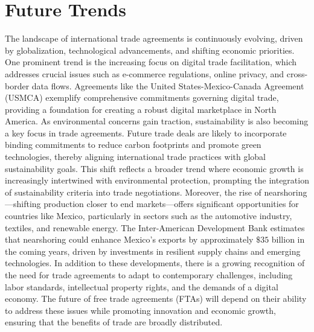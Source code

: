 \documentclass[12pt]{article}
\begin{document}
\section{Future Trends}
The landscape of international trade agreements is continuously evolving, driven by globalization, technological advancements, and shifting economic priorities. One prominent trend is the increasing focus on digital trade facilitation, which addresses crucial issues such as e-commerce regulations, online privacy, and cross-border data flows. Agreements like the United States-Mexico-Canada Agreement (USMCA) exemplify comprehensive commitments governing digital trade, providing a foundation for creating a robust digital marketplace in North America. As environmental concerns gain traction, sustainability is also becoming a key focus in trade agreements. Future trade deals are likely to incorporate binding commitments to reduce carbon footprints and promote green technologies, thereby aligning international trade practices with global sustainability goals. This shift reflects a broader trend where economic growth is increasingly intertwined with environmental protection, prompting the integration of sustainability criteria into trade negotiations.  Moreover, the rise of nearshoring—shifting production closer to end markets—offers significant opportunities for countries like Mexico, particularly in sectors such as the automotive industry, textiles, and renewable energy. The Inter-American Development Bank estimates that nearshoring could enhance Mexico's exports by approximately $\$35$ billion in the coming years, driven by investments in resilient supply chains and emerging technologies.  In addition to these developments, there is a growing recognition of the need for trade agreements to adapt to contemporary challenges, including labor standards, intellectual property rights, and the demands of a digital economy. The future of free trade agreements (FTAs) will depend on their ability to address these issues while promoting innovation and economic growth, ensuring that the benefits of trade are broadly distributed.
\end{document}

